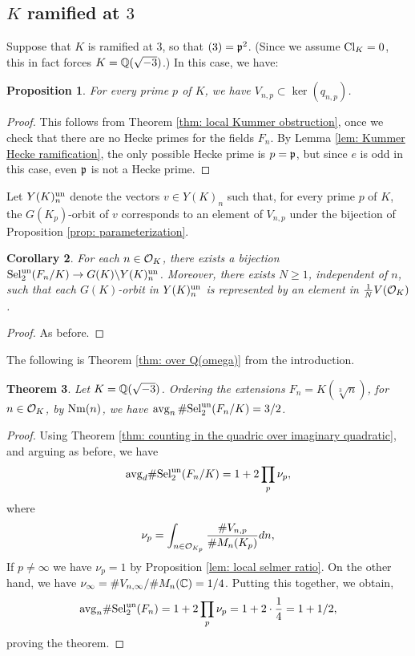 \documentclass[11pt,a4paper]{amsart}
\def\Q{{\rm \mathbb{Q}}}
\def\C{{\rm \mathbb{C}}}
\def\p{{\rm \mathfrak{p}}}
\def\O{{\rm \mathcal{O}}}
\def\Nm{{\rm Nm}}
\def\un{{\rm un}}
\def\avg{{\rm avg}}
\def\Cl{{\rm Cl}}
\def\Sel{{\rm Sel}}
\numberwithin{equation}{section}
\newtheorem{theorem}{Theorem}[section]
\newtheorem{corollary}[theorem]{Corollary}
\newtheorem{proposition}[theorem]{Proposition}
\begin{document}
\subsection{$K$ ramified at $3$} 
Suppose that $K$ is ramified at $3$, so that $(3) = \p^2$. (Since we assume $\Cl_K = 0$, this in fact forces $K = \Q(\sqrt{-3})$.)  In this case, we have:
\begin{proposition}\label{prop: local signature elements are unobstructed over K}
For every prime $p$ of $K$, we have $V_{n,p} \subset \ker(q_{n,p})$.
\end{proposition}
\begin{proof}
    This follows from Theorem \ref{thm: local Kummer obstruction}, once we check that there are no Hecke primes for the fields $F_n$. By Lemma \ref{lem: Kummer Hecke ramification}, the only possible Hecke prime is $p  = \p$, but since $e$ is odd in this case, even $\p$ is not a Hecke prime. 
\end{proof}


Let $Y(K)_n^\un$ denote the vectors $v \in Y(K)_n$ such that, for every prime $p$ of $K$, the $G(K_p)$-orbit of $v$ corresponds to an element of $V_{n,p}$ under the bijection of Proposition \ref{prop: parameterization}. 

\begin{corollary}\label{cor: Z[omega] bijection}
For each $n \in \O_K$, there exists a bijection $\Sel_2^\un(F_n/K) \to G(K)\backslash Y(K)^\un_n$. Moreover, there exists $N \geq 1$,  independent of $n$, such that each $G(K)$-orbit in $Y(K)^\un_n$ is represented by an element in $\frac{1}{N}V(\O_K)$. 
\end{corollary}

\begin{proof}
As before.
\end{proof}

The following is Theorem \ref{thm: over Q(omega)} from the introduction.


\begin{theorem}\label{thm: C_3 selmer avg}
    Let $K = \Q(\sqrt{-3})$. Ordering the extensions $F_n = K(\sqrt[3]{n})$, for $n \in \O_K$,  by $\Nm(n)$, we have $\avg_n \,  \#\Sel_2^\un(F_n/K) = 3/2$.
\end{theorem}

\begin{proof}
Using Theorem \ref{thm: counting in the quadric over imaginary quadratic}, and arguing as before, we have
\[\avg_d \#\Sel_2^\un(F_n/K) = 1 + 2\prod_p \nu_p,\] 
where 
\[\nu_p = \int_{n \in \O_{K_p}} \frac{\#V_{n,p}}{\#M_n(K_p)}dn,\]
If $p \neq \infty$ we have $\nu_p = 1$ by Proposition \ref{lem: local selmer ratio}. 
On the other hand, we have $\nu_\infty = \#V_{n,\infty}/\#M_n(\C) =1/4$.
Putting this together, we obtain,
\[\avg_n \#\Sel_2^\un(F_n) = 1 + 2\prod_p \nu_p =1 + 2\cdot \frac14 =  1 + 1/2,\]
proving the theorem.
\end{proof}
\end{document}
